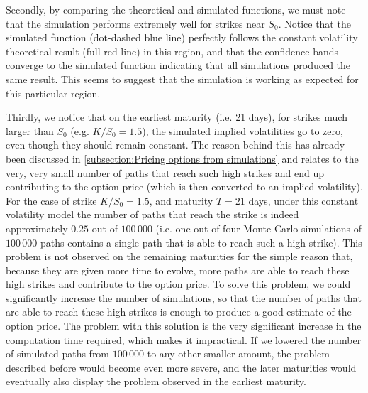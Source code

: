 Secondly, by comparing the theoretical and simulated functions, we must note that the simulation performs extremely well for strikes near $S_0$. Notice that the simulated function (dot-dashed blue line) perfectly follows the constant volatility theoretical result (full red line) in this region, and that the confidence bands converge to the simulated function indicating that all simulations produced the same result. This seems to suggest that the simulation is working as expected for this particular region.

Thirdly, we notice that on the earliest maturity (i.e. 21 days), for strikes much larger than $S_0$ (e.g. $K/S_0=1.5$), the simulated implied volatilities go to zero, even though they should remain constant. The reason behind this has already been discussed in \autoref{subsection:Pricing options from simulations} and relates to the very, very small number of paths that reach such high strikes and end up contributing to the option price (which is then converted to an implied volatility). For the case of strike $K/S_0=1.5$, and maturity $T=21$ days, under this constant volatility model the number of paths that reach the strike is indeed approximately $0.25$ out of $100\,000$ (i.e. one out of four Monte Carlo simulations of $100\,000$ paths contains a single path that is able to reach such a high strike). This problem is not observed on the remaining maturities for the simple reason that, because they are given more time to evolve, more paths are able to reach these high strikes and contribute to the option price.
To solve this problem, we could significantly increase the number of simulations, so that the number of paths that are able to reach these high strikes is enough to produce a good estimate of the option price. The problem with this solution is the very significant increase in the computation time required, which makes it impractical.
If we lowered the number of simulated paths from $100\,000$ to any other smaller amount, the problem described before would become even more severe, and the later maturities would eventually also display the problem observed in the earliest maturity.

